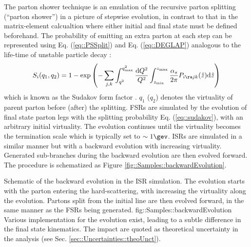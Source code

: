 The parton shower technique is an emulation of the recursive parton splitting (``parton shower'') in a picture of stepwise evolution, in contrast to that in the matrix-element calcualtion where either initial and final state must be defined beforehand. 
The probability of emitting an extra parton at each step can be represented 
using Eq. (\ref{eq::PSSplit}) and Eq. (\ref{eq::DEGLAP})
analogous to the life-time of unstable particle decay :
\begin{align}
S_{i}(q_1, q_2) = 1 - \exp{ \left( -\sum_{j,k} \int_{q^2}^{q_{\mathrm{max}}^2} \frac{\mathrm{d}Q^2}{Q^2} \int_{z_{\min}}^{z_{\max}} \frac{\alpha_s}{2\pi} P_{i \ra j k}(\hat{z}) \mathrm{d}\hat{z}  \right)}
\label{eq::sudakov}
\end{align}
which is known as the Sudakov form factor \cite{Sudakov}.
$q_1$ ($q_2$) denotes the virtuality of parent parton before (after) the splitting.
%
FSRs are simulated by the evolution of final state parton legs with the splitting probability Eq. (\ref{eq::sudakov}), with an arbitrary initial virtuality. 
The evolution continues until the virtuality becomes the termination scale which is typically set to $\sim 1\gev$. ISRs are simulated in a similar manner but with a backward evolution with increasing virtuality. Generated sub-branches during the backward evolution are then evolved forward. The procedure is schematized as Figure \ref{fig::Samples::backwardEvolution}.

{Schematic of the backward evolution in the ISR simulation. 
The evolution starts with the parton entering the hard-scattering, with increasing the virtuality along the evolution. Partons split from the initial line are then evolved forward, in the same manner as the FSRs being generated.}
{fig::Samples::backwardEvolution}
Various implementation for the evolution exist, leading to a subtle difference in the final state kinematics. 
The impact are quoted as theoretical uncertainty in the analysis (see Sec. \ref{sec::Uncertainties::theoUnct}). \\


